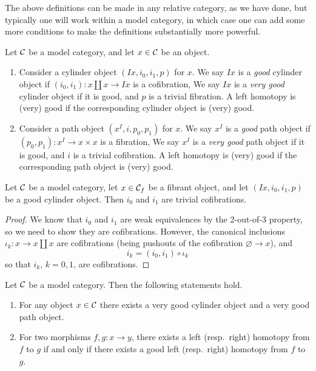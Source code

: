 The above definitions can be made in any relative category, as we have done, but typically one will work within a model category, in which case one can add some more conditions
to make the definitions substantially more powerful.
\begin{definition}
	Let \(\mathcal{C}\) be a model category, and let \(x\in\mathcal{C}\) be an object.
	\begin{enumerate}[label=(\roman*)]
		\item Consider a cylinder object \((Ix,i_0,i_1,p)\) for \(x\). We say \(Ix\) is a \emph{good} cylinder object if \((i_0,i_1)\!:x\amalg x\to Ix\) is a cofibration,
		We say \(Ix\) is a \emph{very good} cylinder object if it is good, and \(p\) is a trivial fibration. A left homotopy is (very) good if the corresponding cylinder object is (very) good.
		\item Consider a path object \((x^I,i,p_0,p_1)\) for \(x\). We say \(x^I\) is a \emph{good} path object if \((p_0,p_1)\!:x^I\to x\times x\) is a fibration,
		We say \(x^I\) is a \emph{very good} path object if it is good, and \(i\) is a trivial cofibration. A left homotopy is (very) good if the corresponding path object is (very) good.
	\end{enumerate}
\end{definition}
\begin{lemma}
	Let \(\mathcal{C}\) be a model category, let \(x\in\mathcal{C}_f\) be a fibrant object, and let \((Ix,i_0,i_1,p)\) be a good cylinder object. Then \(i_0\) and \(i_1\)
	are trivial cofibrations.
\end{lemma}
\begin{proof}
We know that \(i_0\) and \(i_1\) are weak equivalences by the 2-out-of-3 property, so we need to show they are cofibrations. However,
the canonical inclusions \(\iota_k\!:x\to x\amalg x\) are cofibrations (being pushouts of the cofibration \(\varnothing\to x\)), and
\[ i_k = (i_0,i_1)\circ\iota_k \]
so that \(i_k\), \(k=0,1\), are cofibrations.
\end{proof}
\begin{proposition}
	Let \(\mathcal{C}\) be a model category. Then the following statements hold.
	\begin{enumerate}[label=(\arabic*)]
		\item For any object \(x\in\mathcal{C}\) there exists a very good cylinder object and a very good path object.
		\item For two morphisms \(f,g\!:x\to y\), there exists a left (resp.\ right) homotopy from \(f\) to \(g\) if and only if there exists a good left (resp.\ right) homotopy from \(f\) to \(g\).
	\end{enumerate}
\end{proposition}
